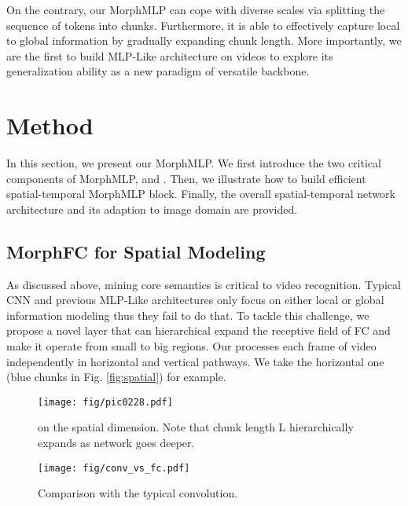 \documentclass[runningheads]{llncs}
\begin{document}
On the contrary, our MorphMLP can cope with diverse scales via splitting the sequence of tokens into  chunks. 
Furthermore, it is able to effectively capture local to global information by gradually expanding chunk length. More importantly, we are the first to build MLP-Like architecture on videos to explore its generalization ability as a new paradigm of versatile backbone.























 
\section{Method}

In this section, we present our MorphMLP.
We first introduce the two critical components of MorphMLP,  and . Then, we illustrate how to build efficient spatial-temporal  MorphMLP block. 
Finally, the overall spatial-temporal network architecture and its adaption to image domain are provided. 



\subsection{MorphFC for Spatial Modeling}

As discussed above, mining core semantics is critical to video recognition. Typical CNN and previous MLP-Like architectures only focus on either local or global information modeling thus they fail to do that. To tackle this challenge, we propose a novel  layer that can hierarchical expand the receptive field of FC  and make it operate from small to big regions.
Our  processes each frame of video independently in horizontal and vertical pathways. We take the horizontal one (blue chunks in Fig.  \ref{fig:spatial}) for example.


\begin{figure}[t]
\centering
\begin{minipage}[t]{0.52\linewidth}
\centering
\texttt{[image: fig/pic0228.pdf]}
\caption{ on the spatial dimension. Note that chunk length L hierarchically expands as network goes deeper.}
\label{fig:spatial}
\end{minipage}
\hspace{0cm}
\begin{minipage}[t]{0.45\linewidth}
\centering
\texttt{[image: fig/conv\_vs\_fc.pdf]}
\caption{Comparison with the typical convolution.}
\label{fig:vsconv}
\end{minipage}
\end{figure}
\end{document}
